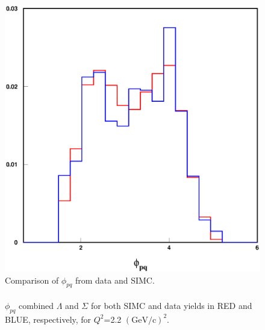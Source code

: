 \begin{figure}[!tbp]
  \centering
  \includegraphics[width=0.8\columnwidth]{com_plot_2_phi_2}
  \caption[Comparison of $\phi_{pq}$ from data and SIMC.]{\label{fig:com_plot_2_phi_2}Comparison of $\phi_{pq}$ from data and SIMC.\\\\ $\phi_{pq}$ combined $\Lambda$ and $\Sigma$ for both SIMC and data yields in RED and BLUE, respectively, for $Q^2$=2.2 $(\mathrm{GeV/c})^2$.}
\end{figure}
